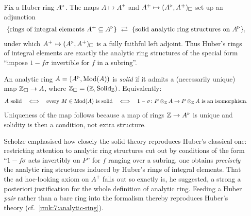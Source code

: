 \begin{theorem}
\label{thm:8:correspondence}
Fix a Huber ring $A^{\triangleright}$. The maps $A\mapsto A^{+}$ and
$A^{+}\mapsto(A^{\triangleright},A^{+})_{\square}$ set up an adjunction
\begin{equation*}
\{\text{rings of integral elements }A^{+}\subseteq A^{\triangleright}\}\ \rightleftarrows\
\{\text{solid analytic ring structures on }A^{\triangleright}\},
\end{equation*}
under which $A^{+}\mapsto(A^{\triangleright},A^{+})_{\square}$ is a fully faithful left adjoint.
Thus Huber's rings of integral elements are exactly the analytic ring structures
of the special form ``impose $1-f\sigma$ invertible for $f$ in a subring''.
\end{theorem}

\begin{definition}
\label{def:8:solid-analytic-ring}
An analytic ring $A=(A^{\triangleright},\operatorname{Mod}(A))$ is \emph{solid} if it admits a (necessarily
unique) map $\mathbb{Z}_{\square}\to A$, where $\mathbb{Z}_{\square}=(\mathbb{Z},\mathrm{Solid}_{\mathbb{Z}})$.
Equivalently:
\begin{equation*}
A\ \text{solid}\quad\Longleftrightarrow\quad
\text{every }M\in\Mod(A)\ \text{is solid}\quad\Longleftrightarrow\quad
1-\sigma\colon P\otimes_{\mathbb{Z}}A\to P\otimes_{\mathbb{Z}}A\ \text{is an isomorphism}.
\end{equation*}
Uniqueness of the map follows because a map of rings $\mathbb{Z}\to A^{\triangleright}$ is
unique and solidity is then a condition, not extra structure.
\end{definition}

\begin{remark}
\label{rmk:8:aposteriori}
Scholze emphasised how closely the solid theory reproduces Huber's classical one:
restricting attention to analytic ring structures cut out by conditions of the
form ``$1-f\sigma$ acts invertibly on $P$'' for $f$ ranging over a subring, one
obtains \emph{precisely} the analytic ring structures induced by Huber's rings of
integral elements. That the ad hoc-looking axiom on $A^{+}$ falls out so exactly
is, he suggested, a strong a posteriori justification for the whole definition of
analytic ring. Feeding a Huber \emph{pair} rather than a bare ring into the
formalism thereby reproduces Huber's theory (cf.\ \cref{rmk:7:analytic-ring}).
\end{remark}
